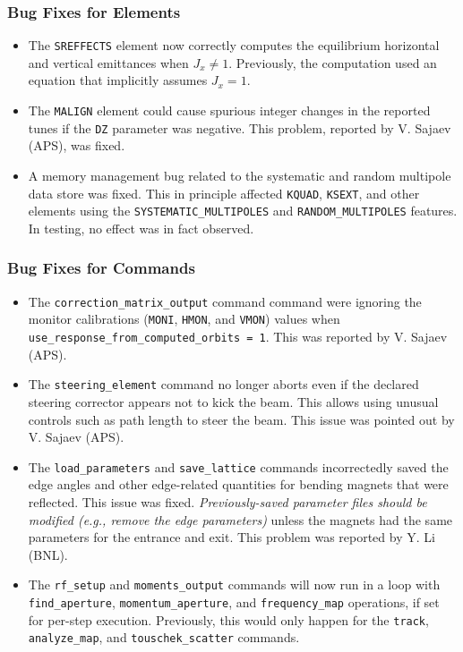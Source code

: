 \documentclass[11pt]{article}
\begin{document}
\subsubsection{Bug Fixes for Elements}

\begin{itemize}
\item The \verb|SREFFECTS| element now correctly computes the equilibrium horizontal and vertical emittances when
  $J_x \neq 1$. Previously, the computation used an equation that implicitly assumes $J_x = 1$.
\item The \verb|MALIGN| element could cause spurious integer changes in the reported tunes if the \verb|DZ| parameter
  was negative. This problem, reported by V. Sajaev (APS), was fixed.
\item A memory management bug related to the systematic and random multipole data store was fixed. This in principle
  affected \verb|KQUAD|, \verb|KSEXT|, and other elements using the \verb|SYSTEMATIC_MULTIPOLES| and \verb|RANDOM_MULTIPOLES|
  features. In testing, no effect was in fact observed.
\end{itemize}

\subsubsection{Bug Fixes for Commands}
\begin{itemize}
\item The \verb|correction_matrix_output| command command were ignoring the monitor calibrations
  (\verb|MONI|, \verb|HMON|, and \verb|VMON|) values when \verb|use_response_from_computed_orbits = 1|.
  This was reported by V. Sajaev (APS).
\item The \verb|steering_element| command no longer aborts even if the declared steering corrector appears 
  not to kick the beam. This allows using unusual controls such as path length to steer the beam. This
  issue was pointed out by V. Sajaev (APS).
\item The \verb|load_parameters| and \verb|save_lattice| commands incorrectedly saved the edge angles and other edge-related
  quantities for bending magnets that were reflected. This issue was fixed. {\em Previously-saved parameter files should be modified
  (e.g., remove the edge parameters)} unless the magnets had the same parameters for the entrance and exit. 
  This problem was reported by Y. Li (BNL).
\item The \verb|rf_setup| and \verb|moments_output| commands will now run in a loop with \verb|find_aperture|,
  \verb|momentum_aperture|, and \verb|frequency_map| operations, if set for per-step execution. Previously,
  this would only happen for the \verb|track|, \verb|analyze_map|, and \verb|touschek_scatter| commands.
\end{itemize}
\end{document}
